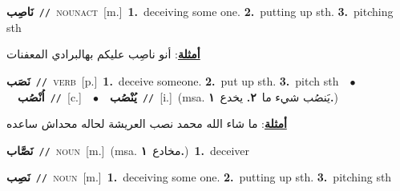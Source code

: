 \documentclass[10pt,a4paper,twoside]{article} %
\begin{document}
\begin{multicols}{2}
{\setlength\topsep{0pt}\textbf{\foreignlanguage{arabic}{نَاصِب}}\ {\color{gray}\texttt{//}\color{black}}\ \textsc{noun\textunderscore act}\ [m.]\ \textbf{1.}~deceiving some one.  \textbf{2.}~putting up sth.  \textbf{3.}~pitching sth\  \begin{flushright}\color{gray}\foreignlanguage{arabic}{\textbf{\underline{\foreignlanguage{arabic}{أمثلة}}}: أنو ناصِب عليكم بهالبرادي المعفنات}\end{flushright}\color{black}} \vspace{2mm}

{\setlength\topsep{0pt}\textbf{\foreignlanguage{arabic}{نَصَب}}\ {\color{gray}\texttt{//}\color{black}}\ \textsc{verb}\ [p.]\ \textbf{1.}~deceive someone.  \textbf{2.}~put up sth.  \textbf{3.}~pitch sth\ \ $\bullet$\ \ \setlength\topsep{0pt}\textbf{\foreignlanguage{arabic}{اُنْصُب}}\ {\color{gray}\texttt{//}\color{black}}\ [c.]\ \ $\bullet$\ \ \setlength\topsep{0pt}\textbf{\foreignlanguage{arabic}{يُنْصُب}}\ {\color{gray}\texttt{//}\color{black}}\ [i.]\ \color{gray}(msa. \foreignlanguage{arabic}{يَنصُب شيء ما}~\foreignlanguage{arabic}{\textbf{٢.}}  \foreignlanguage{arabic}{يخدع}~\foreignlanguage{arabic}{\textbf{١.}})\color{black}\  \begin{flushright}\color{gray}\foreignlanguage{arabic}{\textbf{\underline{\foreignlanguage{arabic}{أمثلة}}}: ما شاء الله محمد نصب العريشة لحاله محداش ساعده}\end{flushright}\color{black}} \vspace{2mm}

{\setlength\topsep{0pt}\textbf{\foreignlanguage{arabic}{نَصَّاب}}\ {\color{gray}\texttt{//}\color{black}}\ \textsc{noun}\ [m.]\ \color{gray}(msa. \foreignlanguage{arabic}{مخادع}~\foreignlanguage{arabic}{\textbf{١.}})\color{black}\ \textbf{1.}~deceiver\ } \vspace{2mm}

{\setlength\topsep{0pt}\textbf{\foreignlanguage{arabic}{نَصِب}}\ {\color{gray}\texttt{//}\color{black}}\ \textsc{noun}\ [m.]\ \textbf{1.}~deceiving some one.  \textbf{2.}~putting up sth.  \textbf{3.}~pitching sth\ } \vspace{2mm}


\end{multicols}
\end{document}
